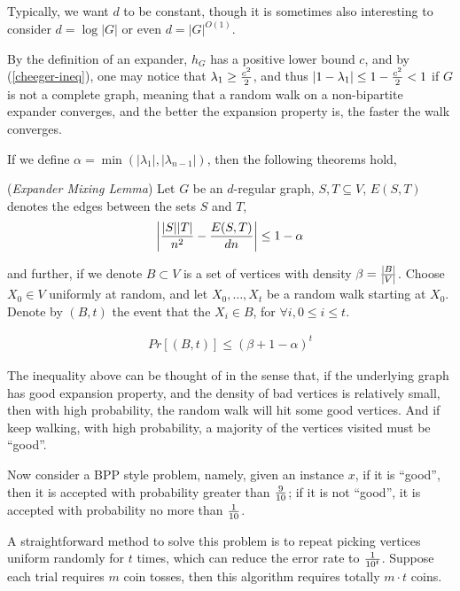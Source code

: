 Typically, we want $d$ to be constant, though it is sometimes also
interesting to consider $d=\log{|G|}$ or even $d=|G|^{O(1)}$.

By the definition of an expander, $h_G$ has a positive lower bound
$c$, and by (\ref{cheeger-ineq}), one may notice that $\lambda_1\ge
{c^2\over 2}$, and thus $|1-\lambda_1|\le 1-{c^2\over 2}<1$ if $G$
is not a complete graph, meaning that a random walk on a
non-bipartite expander converges, and the better the expansion
property is, the faster the walk converges.

If we define $\alpha=\min{(|\lambda_1|,|\lambda_{n-1}|)}$, then the
following theorems hold,

\begin{theorem}(\emph{Expander Mixing Lemma})
Let $G$ be an $d$-regular graph, $S,T\subseteq V$, $E(S,T)$ denotes
the edges between the sets $S$ and $T$,
\begin{eqnarray*}
\left|{|S||T|\over n^2}-{E(S,T)\over dn}\right|\le 1-\alpha
\end{eqnarray*}
\end{theorem}

and further, if we denote $B\subset V$ is a set of vertices with
density $\beta={|B|\over|V|}$. Choose $X_0\in V$ uniformly at
random, and let $X_0,\dots,X_t$ be a random walk starting at $X_0$.
Denote by $(B,t)$ the event that the $X_i\in B$, for $\forall i,
0\le i\le t$.

\begin{theorem}
\begin{eqnarray*}
Pr[(B,t)]\le(\beta+1-\alpha)^t
\end{eqnarray*}
\end{theorem}

The inequality above can be thought of in the sense that, if the
underlying graph has good expansion property, and the density of bad
vertices is relatively small, then with high probability, the random
walk will hit some good vertices. And if keep walking, with high
probability, a majority of the vertices visited must be ``good''.

Now consider a BPP style problem, namely, given an instance $x$, if
it is ``good'', then it is accepted with probability greater than
$9\over 10$; if it is not ``good'', it is accepted with probability
no more than $1\over 10$.

A straightforward method to solve this problem is to repeat picking
vertices uniform randomly for $t$ times, which can reduce the error
rate to ${1\over 10^t}$. Suppose each trial requires $m$ coin
tosses, then this algorithm requires totally $m\cdot t$ coins.

